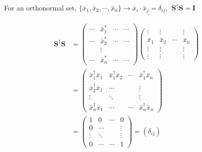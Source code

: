 \documentclass[a4paper, 11pt, normalem]{report}
\begin{document}
For an orthonormal set, $\{\bar{x}_1, \bar{x}_2, \cdots, \bar{x}_n\} \to \underline{\bar{x}_i \cdot \bar{x}_j = \delta_{ij}},~~ \mathbf{S^{\dagger}S} = \mathbf{I}$

\begin{align*}
    \mathbf{S^{\dagger}S} &=
    \begin{pmatrix}
        \cdots & \bar{x}_{1}^* & \cdots & \cdots \\
        \cdots & \bar{x}_{2}^* & \cdots & \cdots \\
               & \vdots        &        &        \\
        \cdots & \bar{x}_{n}^* & \cdots & \cdots
    \end{pmatrix}
    \begin{pmatrix}
        \vdots & \vdots & & \vdots \\
        \bar{x}_1 & \bar{x}_2 & \cdots & \bar{x}_n \\
        \vdots & \vdots & & \vdots \\
        \vdots & \vdots & & \vdots
    \end{pmatrix} \\ &=
    \begin{pmatrix}
        \bar{x}_{1}^{\dagger}\bar{x}_{1} & \bar{x}_{1}^{\dagger}\bar{x}_{2} & \cdots & \bar{x}_{1}^{\dagger}\bar{x}_{n} \\
        \bar{x}_{2}^{\dagger}\bar{x}_{1} & \cdots & & \vdots \\
        \vdots & \ddots & & \vdots \\
        \bar{x}_{n}^{\dagger}\bar{x}_{1} & \cdots & \cdots & \bar{x}_{n}^{\dagger}\bar{x}_{n}
    \end{pmatrix} \\ &=
    \begin{pmatrix}
        1 & 0 & \cdots & 0 \\
        0 & \cdots & & \vdots \\
        \vdots & \ddots & & \vdots \\
        0 & \cdots & \cdots & 1
    \end{pmatrix} = (\delta_{ij}) &
\end{align*}
\end{document}
